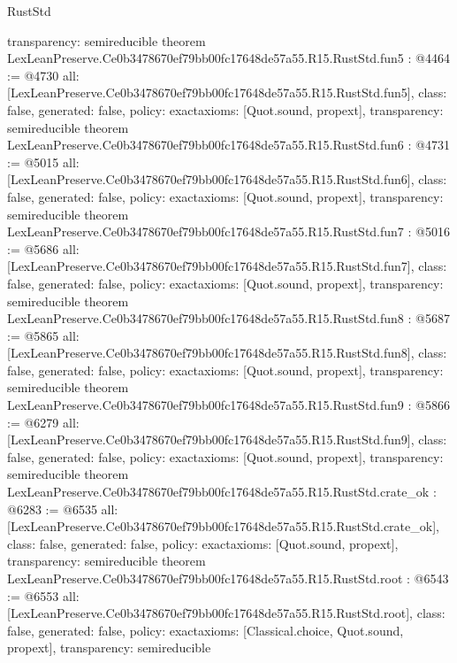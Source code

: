 \begin{lexlean}{RustStd}
\begin{coremodule}
{  transparency: semireducible
}
theorem LexLeanPreserve.Ce0b3478670ef79bb00fc17648de57a55.R15.RustStd.fun5 : @4464 := @4730 {
  all: [LexLeanPreserve.Ce0b3478670ef79bb00fc17648de57a55.R15.RustStd.fun5],
  class: false,
  generated: false,
  policy: exact{axioms: [Quot.sound, propext]},
  transparency: semireducible
}
theorem LexLeanPreserve.Ce0b3478670ef79bb00fc17648de57a55.R15.RustStd.fun6 : @4731 := @5015 {
  all: [LexLeanPreserve.Ce0b3478670ef79bb00fc17648de57a55.R15.RustStd.fun6],
  class: false,
  generated: false,
  policy: exact{axioms: [Quot.sound, propext]},
  transparency: semireducible
}
theorem LexLeanPreserve.Ce0b3478670ef79bb00fc17648de57a55.R15.RustStd.fun7 : @5016 := @5686 {
  all: [LexLeanPreserve.Ce0b3478670ef79bb00fc17648de57a55.R15.RustStd.fun7],
  class: false,
  generated: false,
  policy: exact{axioms: [Quot.sound, propext]},
  transparency: semireducible
}
theorem LexLeanPreserve.Ce0b3478670ef79bb00fc17648de57a55.R15.RustStd.fun8 : @5687 := @5865 {
  all: [LexLeanPreserve.Ce0b3478670ef79bb00fc17648de57a55.R15.RustStd.fun8],
  class: false,
  generated: false,
  policy: exact{axioms: [Quot.sound, propext]},
  transparency: semireducible
}
theorem LexLeanPreserve.Ce0b3478670ef79bb00fc17648de57a55.R15.RustStd.fun9 : @5866 := @6279 {
  all: [LexLeanPreserve.Ce0b3478670ef79bb00fc17648de57a55.R15.RustStd.fun9],
  class: false,
  generated: false,
  policy: exact{axioms: [Quot.sound, propext]},
  transparency: semireducible
}
theorem LexLeanPreserve.Ce0b3478670ef79bb00fc17648de57a55.R15.RustStd.crate_ok : @6283 := @6535 {
  all: [LexLeanPreserve.Ce0b3478670ef79bb00fc17648de57a55.R15.RustStd.crate_ok],
  class: false,
  generated: false,
  policy: exact{axioms: [Quot.sound, propext]},
  transparency: semireducible
}
theorem LexLeanPreserve.Ce0b3478670ef79bb00fc17648de57a55.R15.RustStd.root : @6543 := @6553 {
  all: [LexLeanPreserve.Ce0b3478670ef79bb00fc17648de57a55.R15.RustStd.root],
  class: false,
  generated: false,
  policy: exact{axioms: [Classical.choice, Quot.sound, propext]},
  transparency: semireducible
}


\end{coremodule}
\end{lexlean}
